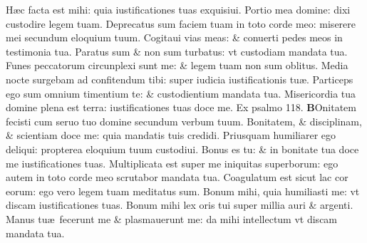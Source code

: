 \documentclass[a5paper,10pt]{book}
\def\ae{æ}
\begin{document}
\begin{multicols*}{2}
\newline \color{red} H\color{black}\ae c facta est mihi: quia iustificationes tuas exquisiui.
\newline \color{red} P\color{black}ortio mea domine: dixi custodire legem tuam.
\newline \color{red} D\color{black}eprecatus sum faciem tuam in toto corde meo: miserere mei secundum eloquium tuum.
\newline \color{red} C\color{black}ogitaui vias meas: \& conuerti pedes meos in testimonia tua.
\newline \color{red} P\color{black}aratus sum \& non sum turbatus: vt custodiam mandata tua.
\newline \color{red} F\color{black}unes peccatorum circunplexi sunt me: \& legem tuam non sum oblitus.
\newline \color{red} M\color{black}edia nocte surgebam ad confitendum tibi: super iudicia iustificationis tu\ae .
\newline \color{red} P\color{black}articeps ego sum omnium timentium te: \& custodientium mandata tua.
\newline \color{red} M\color{black}isericordia tua domine plena est terra: iustificationes tuas doce me. \quad \color{red} Ex psalmo 118. \color{black}
\vspace{-1em}
\lettrine[lines=2]{\bfseries \color{red} B}{}Onitatem fecisti cum seruo tuo domine secundum verbum tuum.
\newline \color{red} B\color{black}onitatem, \& disciplinam, \& scientiam doce me: quia mandatis tuis credidi.
\newline \color{red} P\color{black}riusquam humiliarer ego deliqui: propterea eloquium tuum custodiui.
\newline \color{red} B\color{black}onus es tu: \& in bonitate tua doce me iustificationes tuas.
\newline \color{red} M\color{black}ultiplicata est super me iniquitas superborum: ego autem in toto corde meo scrutabor mandata tua.
\newline \color{red} C\color{black}oagulatum est sicut lac cor eorum: ego vero legem tuam meditatus sum.
\newline \color{red} B\color{black}onum mihi, quia humiliasti me: vt discam iustificationes tuas.
\newline \color{red} B\color{black}onum mihi lex oris tui super millia auri \& argenti.
\newline \color{red} M\color{black}anus tu\ae \ fecerunt me \& plasmauerunt me: da mihi intellectum vt discam mandata tua.

\end{multicols*}
\end{document}
